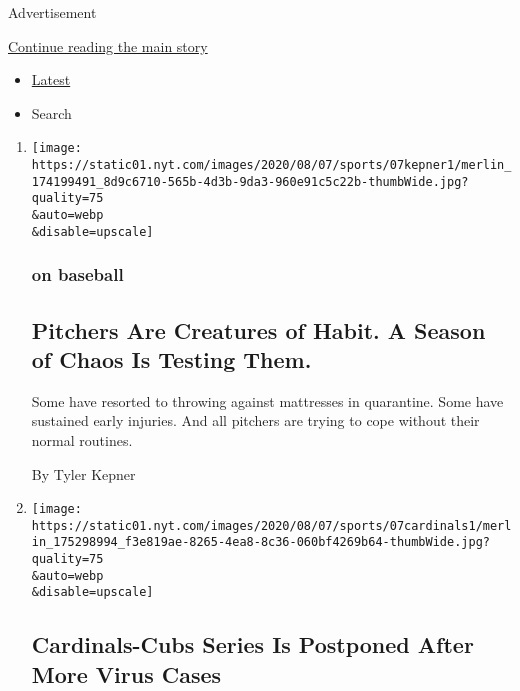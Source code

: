 Advertisement

\protect\hyperlink{after-mid1}{Continue reading the main story}

\begin{itemize}
\tightlist
\item
  \protect\hyperlink{stream-panel}{Latest}
\item
  Search
\end{itemize}

\begin{enumerate}
\def\labelenumi{\arabic{enumi}.}
\item
  \href{/2020/08/08/sports/baseball/mlb-pitching-injuries.html}{}

  \texttt{[image: https://static01.nyt.com/images/2020/08/07/sports/07kepner1/merlin\_174199491\_8d9c6710-565b-4d3b-9da3-960e91c5c22b-thumbWide.jpg?quality=75\\\&auto=webp\\\&disable=upscale]}

  \hypertarget{on-baseball}{%
  \subsubsection{on baseball}\label{on-baseball}}

  \hypertarget{pitchers-are-creatures-of-habit-a-season-of-chaos-is-testing-them}{%
  \subsection{Pitchers Are Creatures of Habit. A Season of Chaos Is
  Testing
  Them.}\label{pitchers-are-creatures-of-habit-a-season-of-chaos-is-testing-them}}

  Some have resorted to throwing against mattresses in quarantine. Some
  have sustained early injuries. And all pitchers are trying to cope
  without their normal routines.

  By Tyler Kepner
\item
  \href{/2020/08/07/sports/baseball/cardinals-game-postponed-coronavirus.html}{}

  \texttt{[image: https://static01.nyt.com/images/2020/08/07/sports/07cardinals1/merlin\_175298994\_f3e819ae-8265-4ea8-8c36-060bf4269b64-thumbWide.jpg?quality=75\\\&auto=webp\\\&disable=upscale]}

  \hypertarget{cardinals-cubs-series-is-postponed-after-more-virus-cases}{%
  \subsection{Cardinals-Cubs Series Is Postponed After More Virus
  Cases}\label{cardinals-cubs-series-is-postponed-after-more-virus-cases}}


\end{enumerate}
